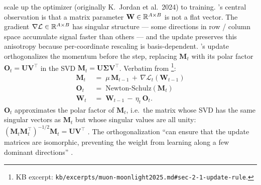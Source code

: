 \citet{muon-moonlight2025} scale up the  optimizer
(originally K.\ Jordan et al.\ 2024) to  training. 's central
observation is that a matrix parameter $\mathbf{W} \in \mathbb{R}^{A \times B}$
is not a flat vector. The gradient $\nabla \mathcal{L} \in \mathbb{R}^{A
\times B}$ has singular structure --- some directions in row /
column space accumulate signal faster than others --- and the 
update preserves this anisotropy because per-coordinate rescaling is
basis-dependent. 's update orthogonalizes the momentum before
the step, replacing $\mathbf{M}_t$ with its polar factor $\mathbf{O}_t
= \mathbf{U} \mathbf{V}^\top$ in the SVD $\mathbf{M}_t = \mathbf{U}
\boldsymbol{\Sigma} \mathbf{V}^\top$. Verbatim from
\citet[\S 2.1, eq.\ 1]{muon-moonlight2025}\footnote{KB excerpt:
\nolinkurl{kb/excerpts/muon-moonlight2025.md#sec-2-1-update-rule}.}:
\begin{equation}
\begin{aligned}
\mathbf{M}_t &\;=\; \mu \, \mathbf{M}_{t-1} \,+\, \nabla \mathcal{L}_t(\mathbf{W}_{t-1}) \\
\mathbf{O}_t &\;=\; \mathrm{Newton\text{-}Schulz}(\mathbf{M}_t) \\
\mathbf{W}_t &\;=\; \mathbf{W}_{t-1} \,-\, \eta_t \,\mathbf{O}_t.
\end{aligned}
\label{eq:muon-vanilla}
\tag{3}
\end{equation}
$\mathbf{O}_t$ approximates the polar factor of $\mathbf{M}_t$, i.e.\
the matrix whose SVD has the same singular vectors as $\mathbf{M}_t$
but whose singular values are all unity:
$(\mathbf{M}_t \mathbf{M}_t^\top)^{-1/2} \mathbf{M}_t = \mathbf{U}
\mathbf{V}^\top$ \citep[\S 2.1]{muon-moonlight2025}. The
orthogonalization ``can ensure that the update matrices are
isomorphic, preventing the weight from learning along a few dominant
directions'' \citep[\S 2.1]{muon-moonlight2025}.

